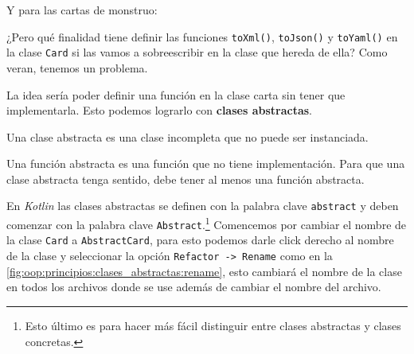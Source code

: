   Y para las cartas de monstruo:


  ¿Pero qué finalidad tiene definir las funciones \texttt{toXml()}, \texttt{toJson()} y 
  \texttt{toYaml()} en la clase \texttt{Card} si las vamos a sobreescribir en la clase que hereda
  de ella?
  Como veran, tenemos un problema.

  La idea sería poder definir una función en la clase carta sin tener que implementarla.
  Esto podemos lograrlo con \textbf{clases abstractas}.

  \begin{defaultbox}
    Una clase abstracta es una clase incompleta que no puede ser instanciada.

    Una función abstracta es una función que no tiene implementación.
    Para que una clase abstracta tenga sentido, debe tener al menos una función abstracta.
  \end{defaultbox}

  En \textit{Kotlin} las clases abstractas se definen con la palabra clave \texttt{abstract} y deben
  comenzar con la palabra clave \texttt{Abstract}.\footnote{
    Esto último es para hacer más fácil distinguir entre clases abstractas y clases concretas.
  }
  Comencemos por cambiar el nombre de la clase \texttt{Card} a \texttt{AbstractCard}, para esto 
  podemos darle click derecho al nombre de la clase y seleccionar la opción \texttt{Refactor ->
  Rename} como en la \cref{fig:oop:principios:clases_abstractas:rename}, esto cambiará el nombre de
  la clase en todos los archivos donde se use además de cambiar el nombre del archivo.

